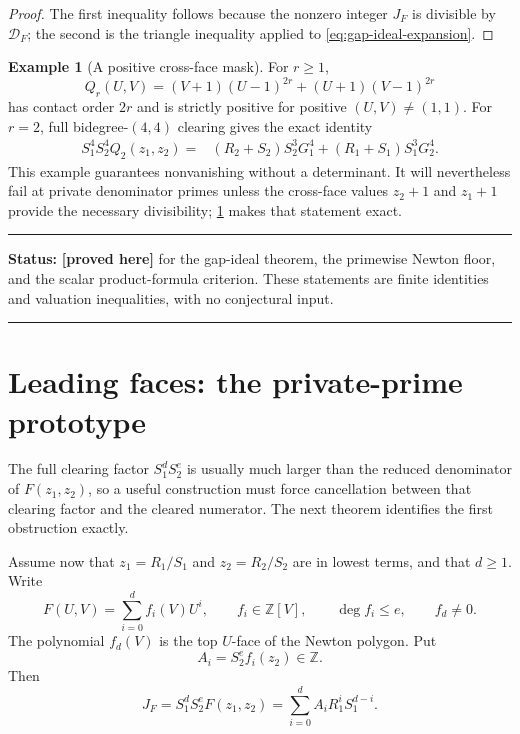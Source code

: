 \documentclass[11pt,oneside]{article}
\theoremstyle{definition}
\newtheorem{example}[theorem]{Example}
\theoremstyle{remark}
\newcommand{\Z}{\mathbb Z}
\newcommand{\statusproved}{\textcolor{provedgreen}{\textbf{[proved here]}}}
\newenvironment{statusbox}[1]
{\begin{center}\begin{minipage}{0.94\textwidth}\raggedright\hrule\vspace{0.45em}
\textbf{Status:} #1\par\vspace{0.35em}}
{\vspace{0.35em}\hrule\end{minipage}\end{center}}
\begin{document}
\begin{proof}
The first inequality follows because the nonzero integer $J_F$ is divisible by
$\mathcal D_F$; the second is the triangle inequality applied to
\eqref{eq:gap-ideal-expansion}.
\end{proof}

\begin{example}[A positive cross-face mask]
\label{ex:positive-cross-face}
For $r\ge1$,
\begin{equation}
 Q_r(U,V)=(V+1)(U-1)^{2r}+(U+1)(V-1)^{2r}
 \label{eq:positive-cross-face}
\end{equation}
has contact order $2r$ and is strictly positive for positive $(U,V)\ne(1,1)$.  For $r=2$,
full bidegree-$(4,4)$ clearing gives the exact identity
\begin{align}
 S_1^4S_2^4Q_2(z_1,z_2)
 ={}&(R_2+S_2)S_2^3G_1^4
   +(R_1+S_1)S_1^3G_2^4.
 \label{eq:positive-cross-cleared}
\end{align}
This example guarantees nonvanishing without a determinant.  It will nevertheless fail at
private denominator primes unless the cross-face values $z_2+1$ and $z_1+1$ provide the
necessary divisibility; \cref{sec:leading-faces} makes that statement exact.
\end{example}

\begin{statusbox}{\statusproved{} for the gap-ideal theorem, the primewise Newton floor, and
the scalar product-formula criterion.  These statements are finite identities and valuation
inequalities, with no conjectural input.}
\end{statusbox}

\section{Leading faces: the private-prime prototype}
\label{sec:leading-faces}

The full clearing factor $S_1^dS_2^e$ is usually much larger than the reduced denominator of
$F(z_1,z_2)$, so a useful construction must force cancellation between that clearing factor
and the cleared numerator.  The next theorem identifies the first obstruction exactly.

Assume now that $z_1=R_1/S_1$ and $z_2=R_2/S_2$ are in lowest terms, and that $d\ge1$.  Write
\begin{equation}
 F(U,V)=\sum_{i=0}^d f_i(V)U^i,
 \qquad f_i\in\Z[V],
 \qquad \deg f_i\le e,
 \qquad f_d\ne0.
 \label{eq:U-slices}
\end{equation}
The polynomial $f_d(V)$ is the top $U$-face of the Newton polygon.  Put
\begin{equation}
 A_i=S_2^e f_i(z_2)\in\Z.
 \label{eq:Ai-cleared}
\end{equation}
Then
\begin{equation}
 J_F=S_1^dS_2^eF(z_1,z_2)
     =\sum_{i=0}^d A_iR_1^iS_1^{d-i}.
 \label{eq:leading-face-sum}
\end{equation}
\end{document}
